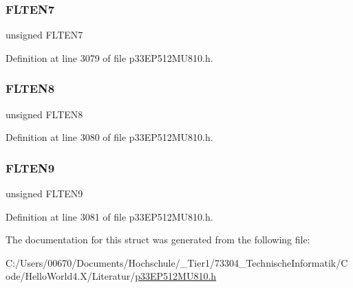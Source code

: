 \subsubsection{\texorpdfstring{F\+L\+T\+E\+N7}{FLTEN7}}
{\footnotesize\ttfamily unsigned F\+L\+T\+E\+N7}



Definition at line 3079 of file p33\+E\+P512\+M\+U810.\+h.

\mbox{\label{structtag_c1_f_e_n1_b_i_t_s_a3d4485461e50847e8dbe581c6a094df8}} 
\subsubsection{\texorpdfstring{F\+L\+T\+E\+N8}{FLTEN8}}
{\footnotesize\ttfamily unsigned F\+L\+T\+E\+N8}



Definition at line 3080 of file p33\+E\+P512\+M\+U810.\+h.

\mbox{\label{structtag_c1_f_e_n1_b_i_t_s_a55018b7d7f9966a022e6ce4585c68d78}} 
\subsubsection{\texorpdfstring{F\+L\+T\+E\+N9}{FLTEN9}}
{\footnotesize\ttfamily unsigned F\+L\+T\+E\+N9}



Definition at line 3081 of file p33\+E\+P512\+M\+U810.\+h.



The documentation for this struct was generated from the following file\+:\begin{DoxyCompactItemize}
\item 
C\+:/\+Users/00670/\+Documents/\+Hochschule/\+\_\+\+Tier1/73304\+\_\+\+Technische\+Informatik/\+Code/\+Hello\+World4.\+X/\+Literatur/\hyperlink{p33_e_p512_m_u810_8h}{p33\+E\+P512\+M\+U810.\+h}\end{DoxyCompactItemize}
